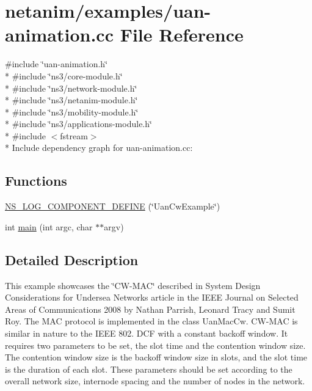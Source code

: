 \hypertarget{uan-animation_8cc}{}\section{netanim/examples/uan-\/animation.cc File Reference}
\label{uan-animation_8cc}
{\ttfamily \#include \char`\"{}uan-\/animation.\+h\char`\"{}}\\*
{\ttfamily \#include \char`\"{}ns3/core-\/module.\+h\char`\"{}}\\*
{\ttfamily \#include \char`\"{}ns3/network-\/module.\+h\char`\"{}}\\*
{\ttfamily \#include \char`\"{}ns3/netanim-\/module.\+h\char`\"{}}\\*
{\ttfamily \#include \char`\"{}ns3/mobility-\/module.\+h\char`\"{}}\\*
{\ttfamily \#include \char`\"{}ns3/applications-\/module.\+h\char`\"{}}\\*
{\ttfamily \#include $<$fstream$>$}\\*
Include dependency graph for uan-\/animation.cc\+:
\subsection*{Functions}
\begin{DoxyCompactItemize}
\item 
\hyperlink{uan-animation_8cc_a02739e5591c200568f56ba0c60dcab1a}{N\+S\+\_\+\+L\+O\+G\+\_\+\+C\+O\+M\+P\+O\+N\+E\+N\+T\+\_\+\+D\+E\+F\+I\+NE} (\char`\"{}Uan\+Cw\+Example\char`\"{})
\item 
int \hyperlink{uan-animation_8cc_a3c04138a5bfe5d72780bb7e82a18e627}{main} (int argc, char $\ast$$\ast$argv)
\end{DoxyCompactItemize}


\subsection{Detailed Description}
This example showcases the \char`\"{}\+C\+W-\/\+M\+A\+C\char`\"{} described in System Design Considerations for Undersea Networks article in the I\+E\+EE Journal on Selected Areas of Communications 2008 by Nathan Parrish, Leonard Tracy and Sumit Roy. The M\+AC protocol is implemented in the class Uan\+Mac\+Cw. C\+W-\/\+M\+AC is similar in nature to the I\+E\+EE 802. D\+CF with a constant backoff window. It requires two parameters to be set, the slot time and the contention window size. The contention window size is the backoff window size in slots, and the slot time is the duration of each slot. These parameters should be set according to the overall network size, internode spacing and the number of nodes in the network.

